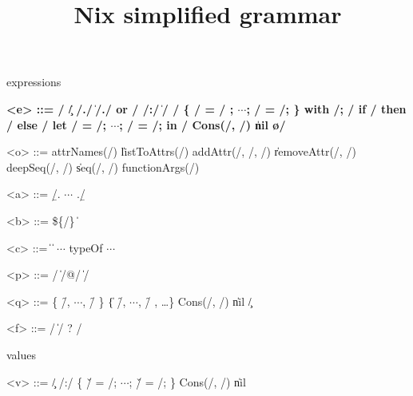 

\title{Nix simplified grammar}


\maketitle{}

\par{expressions}

\begin{grammar}
  \bfseries
  <e> ::=
    \x/ \| \c/
    \alt \e/.\a/ \| \e/.\a/ or \e/
    \alt \p/:\e/ \| \e/ \e/
    \alt \{ \e/ = \e/ ; $\cdots{}$; \e/ = \e/; \}
    \alt with \e/; \e/
    \alt if \e/ then \e/ else \e/
    \alt let \x/ = \e/; $\cdots{}$; \x/ = \e/; in \e/
    \alt Cons(\e/, \e/) \| nil
    \alt \o/

    <o> ::= attrNames(\e/) \| listToAttrs(\e/)
    \alt addAttr(\e/, \e/, \e/) \| removeAttr(\e/, \e/)
    \alt deepSeq(\e/, \e/) \| seq(\e/, \e/)
    \alt functionArgs(\e/)

  <a> ::= \b/. $\cdots{}$ .\b/

  <b> ::= \$\{\e/\} \| 

  <c> ::=  \|  \| $\cdots{}$
    \alt typeOf
    \alt $\cdots{}$

  <p> ::= \q/ \| \q/@\x/ \| \x/

  <q> ::= \{ \f/, $\cdots{}$, \f/ \} \| \{ \f/, $\cdots{}$, \f/ , \ldots{}\}
    \alt Cons(\x/, \x/) \| nil
    \alt \c/

  <f> ::= \x/ \| \x/ ? \e/

\end{grammar}

\par{values}

\begin{grammar}
  \bfseries

  <v> ::=
    \c/
    \alt \p/:\e/
    \alt \{ \v/ = \e/; $\cdots{}$; \v/ = \e/; \}
    \alt Cons(\e/, \e/) \| nil
\end{grammar}

